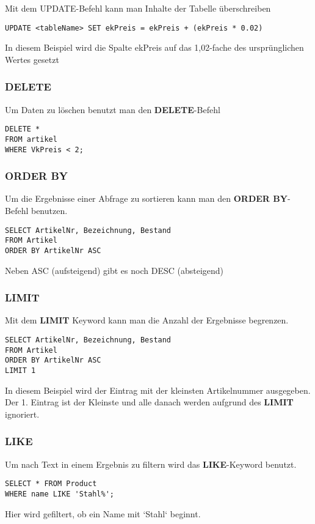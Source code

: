 \documentclass[asp1.tex]{subfiles}
\begin{document}
Mit dem UPDATE-Befehl kann man Inhalte der Tabelle überschreiben
\begin{lstlisting}
UPDATE <tableName> SET ekPreis = ekPreis + (ekPreis * 0.02)
\end{lstlisting}
In diesem Beispiel wird die Spalte ekPreis auf das 1,02-fache des ursprünglichen Wertes gesetzt

\subsubsection{DELETE}
Um Daten zu löschen benutzt man den \textbf{DELETE}-Befehl
\begin{lstlisting}
DELETE *
FROM artikel
WHERE VkPreis < 2;
\end{lstlisting}

\subsubsection{ORDER BY}
Um die Ergebnisse einer Abfrage zu sortieren kann man den \textbf{ORDER BY}-Befehl  benutzen.
\begin{lstlisting}
SELECT ArtikelNr, Bezeichnung, Bestand
FROM Artikel
ORDER BY ArtikelNr ASC
\end{lstlisting}
Neben ASC (aufsteigend)  gibt es noch DESC (absteigend)

\subsubsection{LIMIT}
Mit dem \textbf{LIMIT} Keyword kann man die Anzahl der Ergebnisse begrenzen.
\begin{lstlisting}
SELECT ArtikelNr, Bezeichnung, Bestand
FROM Artikel
ORDER BY ArtikelNr ASC
LIMIT 1
\end{lstlisting}
In diesem  Beispiel wird der Eintrag mit der kleinsten Artikelnummer ausgegeben. \\
Der 1. Eintrag  ist der  Kleinste  und alle danach werden aufgrund des \textbf{LIMIT} ignoriert.

\subsubsection{LIKE}
Um nach Text in einem Ergebnis zu filtern wird das \textbf{LIKE}-Keyword benutzt.
\begin{lstlisting}
SELECT * FROM Product
WHERE name LIKE 'Stahl%';
\end{lstlisting}
Hier wird gefiltert,  ob ein Name mit  `Stahl` beginnt.
\end{document}
